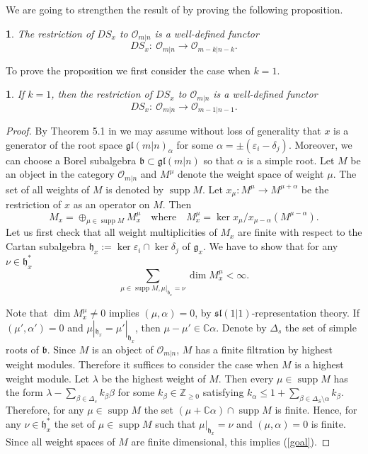 \documentclass[12pt,oneside,english]{amsart}
\numberwithin{equation}{section}
\numberwithin{figure}{section}
\theoremstyle{plain}
\theoremstyle{plain}
\newtheorem{lem}[thm]{\protect\lemmaname}
\theoremstyle{remark}
\theoremstyle{definition}
\theoremstyle{plain}
\theoremstyle{remark}
\theoremstyle{definition}
\theoremstyle{plain}
\theoremstyle{plain}
\newtheorem{prop}[thm]{\protect\propositionname}
\theoremstyle{definition}
\providecommand{\lemmaname}{Lemma}
\providecommand{\propositionname}{Proposition}
\newcommand{\fg}{\mathfrak{g}}
\newcommand{\fh}{\mathfrak{h}}
\newcommand{\Ker}{\operatorname{ker}}
\begin{document}
We are going to strengthen the result of \cite{CS} by proving the following proposition.
\begin{prop}\label{DSO} The restriction of $DS_x$ to $\mathcal{O}_{m|n}$  is a well-defined functor
  $$DS_{x}:\ \mathcal{O}_{m|n} \rightarrow\mathcal{O}_{m-k|n-k}.$$
\end{prop}
To prove the proposition we first consider the case when $k=1$.
\begin{lem}\label{lem:rank1} If $k=1$, then  the restriction of $DS_x$ to  $\mathcal{O}_{m|n}$ is a well-defined functor
  $$DS_{x}:\ \mathcal{O}_{m|n} \rightarrow\mathcal{O}_{m-1|n-1}.$$
\end{lem}
\begin{proof} By Theorem 5.1 in \cite{CS} we may assume without loss of generality that $x$ is a generator of the root space $\mathfrak{gl}(m|n)_{\alpha}$ for some $\alpha=\pm(\varepsilon_i-\delta_j)$.
  Moreover, we can choose a Borel subalgebra $\mathfrak{b}\subset\mathfrak{gl}(m|n)$ so that $\alpha$ is a simple root. Let $M$ be an object in the category
  $\mathcal{O}_{m|n}$ and $M^\mu$ denote the weight space of weight $\mu$. The set of all weights of $M$ is denoted by $\operatorname{supp}M$.
  Let $x_{\mu}:M^\mu\to M^{\mu+\alpha}$ be the restriction of $x$ as an operator on $M$. Then
  $$M_x=\oplus_{\mu\in\operatorname{supp}M}M^{\mu}_x\quad\text{where}\quad M^\mu_x=\Ker x_\mu/x_{\mu-\alpha}(M^{\mu-\alpha}).$$
  Let us first check that all weight multiplicities of $M_x$ are finite with respect to the Cartan subalgebra
  $\fh_x:=\Ker\varepsilon_i\cap\Ker\delta_j$ of $\fg_x$. We have to show that for any
  $\nu\in \fh^*_x$
  \begin{equation}\label{goal}
   \sum_{\mu\in\operatorname{supp}M,\mu|_{\fh_x}=\nu}\dim  M^\mu_x<\infty.
    \end{equation}

 Note that $\dim M_{x}^\mu\neq 0$ implies $(\mu,\alpha)=0$, by $\mathfrak{sl}(1|1)$-representation theory.  If $(\mu',\alpha')=0$ and $\mu|_{\fh_x}=\mu'|_{\fh_x}$, then
  $\mu-\mu'\in\mathbb C\alpha$. Denote by $\Delta_s$ the set of simple roots of $\mathfrak{b}$.
  Since $M$ is an object of  $\mathcal{O}_{m|n}$, $M$ has a finite filtration by highest weight modules. Therefore it suffices to consider the case when $M$ is
  a highest weight module.
  Let $\lambda$ be the highest weight of $M$. Then every $\mu\in\operatorname{supp}M$
  has the form
  $\lambda-\sum_{\beta\in\Delta_s}k_\beta\beta$ for some $k_\beta\in\mathbb Z_{\geq 0}$ satisfying $k_\alpha\leq 1+\sum_{\beta\in\Delta_S\setminus\alpha}k_\beta$.
 Therefore, for any $\mu\in\operatorname{supp}M$ the set $(\mu+\mathbb C\alpha)\cap\operatorname{supp}M$ is finite.
 Hence, for any $\nu\in  \fh^*_x $ the set of $\mu\in\operatorname{supp}M$ such that
 $\mu|_{\fh_x}=\nu$ and $(\mu,\alpha)=0$ is finite. Since all weight spaces of $M$ are finite dimensional, this implies (\ref{goal}).


\end{proof}
\end{document}

